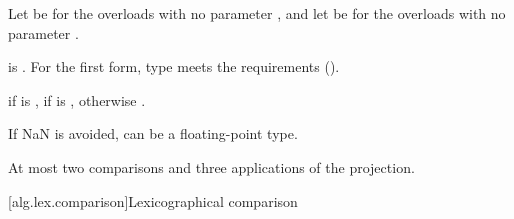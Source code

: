 \begin{itemdescr}
\pnum
Let  be 
for the overloads with no parameter ,
and let  be 
for the overloads with no parameter .

\pnum
\expects
{} is .
For the first form, type 
meets the 
requirements ().

\pnum
\returns
{} if  is ,
 if  is ,
otherwise .

\pnum
\begin{note}
If NaN is avoided,  can be a floating-point type.
\end{note}

\pnum
\complexity
At most two comparisons and three applications of the projection.
\end{itemdescr}

[alg.lex.comparison]{Lexicographical comparison}

